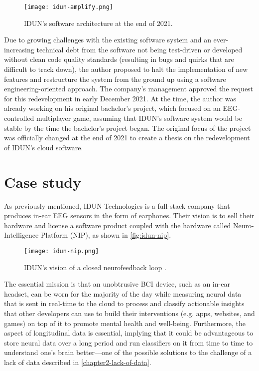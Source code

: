 \begin{figure}[!ht]
  \centering
  \texttt{[image: idun-amplify.png]}
  \caption{IDUN’s software architecture at the end of 2021.}
  \label{fig:idun-amplify}
\end{figure}

Due to growing challenges with the existing software system and an ever-increasing technical debt from the software not being test-driven or developed without clean code quality standards (resulting in bugs and quirks that are difficult to track down), the author proposed to halt the implementation of new features and restructure the system from the ground up using a software engineering-oriented approach. The company’s management approved the request for this redevelopment in early December 2021. At the time, the author was already working on his original bachelor’s project, which focused on an EEG-controlled multiplayer game, assuming that IDUN’s software system would be stable by the time the bachelor’s project began. The original focus of the project was officially changed at the end of 2021 to create a thesis on the redevelopment of IDUN’s cloud software.

\section{Case study}
\label{chapter3-case-study}

As previously mentioned, IDUN Technologies is a full-stack company that produces in-ear EEG sensors in the form of earphones. Their vision is to sell their hardware and license a software product coupled with the hardware called Neuro-Intelligence Platform (NIP), as shown in \autoref{fig:idun-nip}.

\begin{figure}[!ht]
  \centering
  \texttt{[image: idun-nip.png]}
  \caption[IDUN’s vision of a closed neurofeedback loop.]{IDUN’s vision of a closed neurofeedback loop \citep{idun_guardian_nodate}.}
  \label{fig:idun-nip}
\end{figure}

The essential mission is that an unobtrusive BCI device, such as an in-ear headset, can be worn for the majority of the day while measuring neural data that is sent in real-time to the cloud to process and classify actionable insights that other developers can use to build their interventions (e.g. apps, websites, and games) on top of it to promote mental health and well-being. Furthermore, the aspect of longitudinal data is essential, implying that it could be advantageous to store neural data over a long period and run classifiers on it from time to time to understand one’s brain better—one of the possible solutions to the challenge of a lack of data described in \autoref{chapter2-lack-of-data}.

